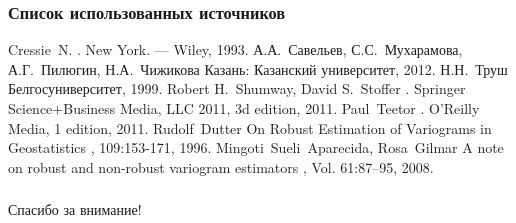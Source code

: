 \documentclass[10pt,pdf,aspectratio=169,hyperref={unicode},notheorems]{beamer}
\theoremstyle{definition}
\theoremstyle{example}
\theoremstyle{plain}
\begin{document}
\begin{frame}
  \frametitle{Список использованных источников}
  \begin{scriptsize}
  \begin{thebibliography}{5}
    \beamertemplatebookbibitems
      Cressie~N.
      .
      \newblock New York. --- Wiley, 1993.
    \beamertemplatebookbibitems
      А.А.~Савельев, С.С.~Мухарамова, А.Г.~Пилюгин, Н.А.~Чижикова
      \newblock Казань: Казанский университет, 2012.
    \beamertemplatebookbibitems
      Н.Н.~Труш
      \newblock Белгосуниверситет, 1999.
    \beamertemplatebookbibitems
      Robert H.~Shumway, David S.~Stoffer
      .
      \newblock Springer Science+Business Media, LLC 2011, 3d edition, 2011.
    \beamertemplatebookbibitems
      Paul~Teetor
      .
      \newblock O’Reilly Media, 1 edition, 2011.
    \beamertemplatearticlebibitems
      Rudolf~Dutter
      \newblock On Robust Estimation of Variograms in Geostatistics
      , 109:153-171, 1996.
    \beamertemplatearticlebibitems
      Mingoti~Sueli~Aparecida, Rosa~Gilmar
      \newblock A note on robust and non-robust variogram estimators
      , Vol. 61:87–95, 2008.
    \beamertemplatebookbibitems
  \end{thebibliography}
\end{scriptsize}
\end{frame}

\begin{frame}
  \frametitle{\null}
  \begin{center}
    {\Huge Спасибо за внимание!}
  \end{center}
\end{frame}
\end{document}
